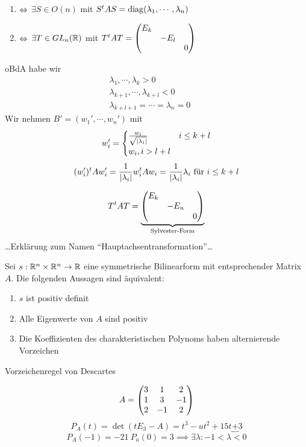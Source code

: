 \begin{Bew}
  \begin{enumerate}
    \item $\Leftrightarrow$ $\exists S\in O(n)$ mit $S^tAS=\operatorname{diag}(\lambda_1,\cdots,\lambda_n)$
    \item $\Leftrightarrow$ $\exists T\in GL_n(\mathbb{R})$ mit $T^tAT=\begin{pmatrix}E_k & &\\ & -E_l&\\& & 0\end{pmatrix}$
  \end{enumerate}
  oBdA habe wir 
  \begin{align*}
    \lambda_1,\cdots,\lambda_k > 0&&\\
    \lambda_{k+1},\cdots,\lambda_{k+l}<0&&\\
    \lambda_{k+l+1}=\cdots=\lambda_n=0&&    
  \end{align*}
  Wir nehmen $B'=\left( w_1',\cdots,w_n' \right)$ mit
  \[w_i'=\begin{cases}
    \frac{w_i}{\sqrt{\left| \lambda_i \right|}}&i\leq k+l\\
    w_i, i>l+l
  \end{cases}\]
  \begin{gather*}
    (w_i')^tAw_i'=\frac{1}{\Abs{\lambda_i}}w_i^tAw_i=\frac{1}{\Abs{\lambda_i}}\lambda_i\ \text{für } i\leq k+l
  \end{gather*}
\end{Bew}
\begin{Bem}
  \begin{gather*}
    T^tAT=\underbrace{\begin{pmatrix}E_k&&\\&-E_n&\\&&0\end{pmatrix}}_{\text{Sylvester-Form}}
  \end{gather*}
  \ldots Erklärung zum Namen ``Hauptachsentransformation''\ldots
\end{Bem}
\begin{Kor}
  Sei $s:\mathbb{R}^n\times\mathbb{R}^n\to\mathbb{R}$ eine symmetrische Bilinearform mit entsprechender Matrix $A$. Die folgenden Aussagen sind äquivalent:
  \begin{enumerate}
    \item $s$ ist positiv definit
    \item Alle Eigenwerte von $A$ sind positiv
    \item Die Koeffizienten des charakteristischen Polynoms haben alternierende Vorzeichen
  \end{enumerate}
  Vorzeichenregel von Descartes
\end{Kor}
\begin{Bsp}
  \[A=\begin{pmatrix}3&1&2\\1&3&-1\\2&-1&2\end{pmatrix}\]
  \[P_A(t)=\det(tE_3-A)=t^3-ut^2+15t\underbrace{+}3\]
  \[P_A(-1)=-21\ P_a(0)=3 \implies \exists \lambda: -1<\lambda<0\]
\end{Bsp}
